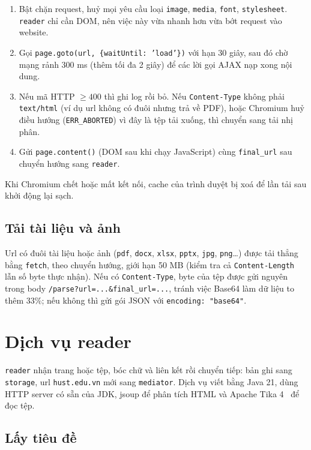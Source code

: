 \documentclass[12pt,a4paper]{report}
\begin{document}
\begin{enumerate}
  \item Bật chặn request, huỷ mọi yêu cầu loại \texttt{image}, \texttt{media}, \texttt{font}, \texttt{stylesheet}.
        \texttt{reader} chỉ cần DOM, nên việc này vừa nhanh hơn vừa bớt request vào website.
  \item Gọi \texttt{page.goto(url, \{waitUntil: 'load'\})} với hạn 30 giây, sau đó chờ mạng rảnh 300 ms (thêm tối đa
        2 giây) để các lời gọi AJAX nạp xong nội dung.
  \item Nếu mã HTTP $\ge 400$ thì ghi log rồi bỏ. Nếu \texttt{Content-Type} không phải \texttt{text/html} (ví dụ url
        không có đuôi nhưng trả về PDF), hoặc Chromium huỷ điều hướng (\texttt{ERR\_\allowbreak{}ABORTED}) vì đây là tệp tải xuống,
        thì chuyển sang tải nhị phân.
  \item Gửi \texttt{page.content()} (DOM sau khi chạy JavaScript) cùng \texttt{final\_\allowbreak{}url} sau chuyển hướng sang
        \texttt{reader}.
\end{enumerate}

Khi Chromium chết hoặc mất kết nối, cache của trình duyệt bị xoá để lần tải sau khởi động lại sạch.

\subsection{Tải tài liệu và ảnh}

Url có đuôi tài liệu hoặc ảnh (\texttt{pdf}, \texttt{docx}, \texttt{xlsx}, \texttt{pptx}, \texttt{jpg},
\texttt{png}\ldots) được tải thẳng bằng \texttt{fetch}, theo chuyển hướng, giới hạn 50 MB (kiểm tra cả
\texttt{Content-Length} lẫn số byte thực nhận). Nếu có \texttt{Content-Type}, byte của tệp được gửi nguyên trong body
\texttt{/parse?url=...\&final\_\allowbreak{}url=...}, tránh việc Base64 làm dữ liệu to thêm 33\%; nếu không thì gửi gói JSON với
\texttt{encoding: "base64"}.

\section{Dịch vụ reader}

\texttt{reader} nhận trang hoặc tệp, bóc chữ và liên kết rồi chuyển tiếp: bản ghi sang \texttt{storage}, url
\texttt{hust.edu.vn} mới sang \texttt{mediator}. Dịch vụ viết bằng Java 21, dùng HTTP server có sẵn của JDK, jsoup để
phân tích HTML và Apache Tika 4~\cite{tika} để đọc tệp.

\subsection{Lấy tiêu đề}
\end{document}
